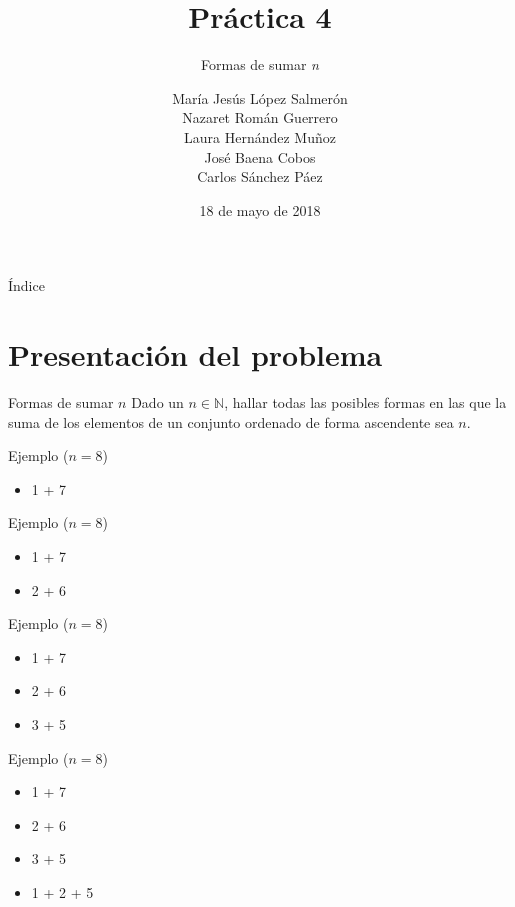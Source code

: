 \documentclass{beamer}
\title{Práctica 4}
\date{18 de mayo de 2018}
\subtitle{Formas de sumar \textit{n}}
\author{María Jesús López Salmerón \\ Nazaret Román Guerrero \\ Laura Hernández Muñoz \\ José Baena Cobos  \\ Carlos Sánchez Páez}
\begin{document}
\centering
\begin{frame}
  \titlepage
\end{frame}

\begin{frame}{Índice}
  \tableofcontents
\end{frame}

\section{Presentación del problema}


\begin{frame}[fragile]{Formas de sumar $n$}
Dado un $n \in \mathbb{N}$, hallar todas las posibles formas en las que la suma de los elementos de un conjunto ordenado de forma ascendente sea $n$.
\end{frame}

\begin{frame}[fragile]{Ejemplo ($n=8$)}
\begin{itemize}
	\item 1 + 7
\end{itemize}
\end{frame}

\begin{frame}[fragile]{Ejemplo ($n=8$)}
\begin{itemize}
	\item 1 + 7
	\item 2 + 6
\end{itemize}
\end{frame}

\begin{frame}[fragile]{Ejemplo ($n=8$)}
\begin{itemize}
	\item 1 + 7
	\item 2 + 6
	\item 3 + 5
\end{itemize}
\end{frame}

\begin{frame}[fragile]{Ejemplo ($n=8$)}
\begin{itemize}
	\item 1 + 7
	\item 2 + 6
	\item 3 + 5
	\item 1 + 2 + 5
\end{itemize}
\end{frame}
\end{document}
